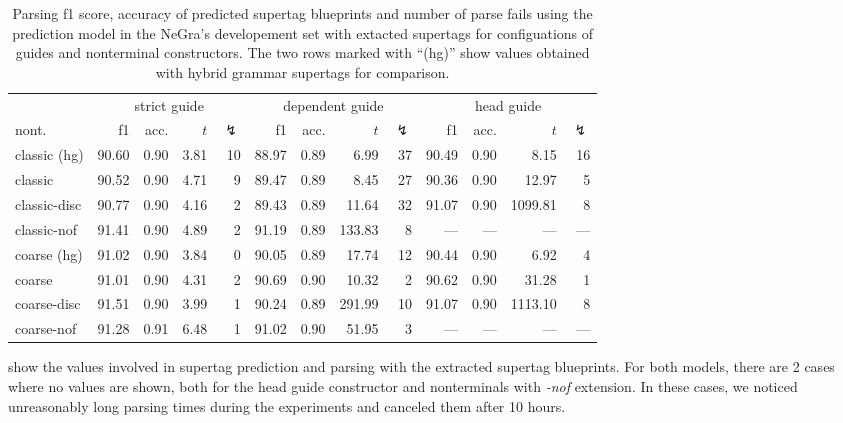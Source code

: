 \documentclass[../../document.tex]{subfiles}
\begin{document}
    \begin{table}
        \caption{\label{tbl:gridsearch:dcp:3}
        Parsing f1 score, accuracy of predicted supertag blueprints and number of parse fails using the  prediction model in the NeGra's developement set with extacted  supertags for configuations of guides and nonterminal constructors. The two rows marked with ``(hg)'' show values obtained with hybrid grammar supertags for comparison.
        }
        \centering
        \setlength{\tabcolsep}{5pt}
        \vspace{.2cm}
        \begin{tabular}{l|rrrr|rrrr|rrrr}
            \toprule
            & \multicolumn{4}{c|}{strict guide} &  \multicolumn{4}{c|}{dependent guide} &  \multicolumn{4}{c}{head guide} \\
nont.           & f1 & acc. & $t$ & $\lightning$ & f1 & acc. & $t$ & $\lightning$ & f1 & acc. & $t$ & $\lightning$  \\ \hline
\rowcolor{black!10}
classic  (hg)   & 90.60 & 0.90 & 3.81 & 10 & 88.97 & 0.89 & 6.99 & 37 & 90.49 & 0.90 & 8.15 & 16\\\hline
classic         & 90.52 & 0.90 & 4.71 &  9 & 89.47 & 0.89 & 8.45 & 27 & 90.36 & 0.90 & 12.97 & 5 \\
classic-disc    & 90.77 & 0.90 & 4.16 &  2 & 89.43 & 0.89 & 11.64 & 32 & 91.07 & 0.90 & 1099.81 & 8 \\
classic-nof     & 91.41 & 0.90 & 4.89 &  2 & 91.19 & 0.89 & 133.83 & 8 & --- & --- & --- & --- \\ \hline
\rowcolor{black!10}
coarse (hg)     & 91.02 & 0.90 & 3.84 &  0 & 90.05 & 0.89 & 17.74 & 12 & 90.44 & 0.90 & 6.92 & 4 \\ \hline
coarse          & 91.01 & 0.90 & 4.31 &  2 & 90.69 & 0.90 & 10.32 & 2 & 90.62 & 0.90 & 31.28 & 1 \\
coarse-disc     & 91.51 & 0.90 & 3.99 &  1 & 90.24 & 0.89 & 291.99 & 10 & 91.07 & 0.90 & 1113.10 & 8 \\
coarse-nof      & 91.28 & 0.91 & 6.48 &  1 & 91.02 & 0.90 & 51.95 & 3 & --- & --- & --- & --- \\
\bottomrule
        \end{tabular}
    \end{table}

     show the values involved in supertag prediction and parsing with the extracted supertag blueprints.
    For both models, there are 2 cases where no values are shown, both for the head guide constructor and nonterminals with \emph{-nof} extension.
    In these cases, we noticed unreasonably long parsing times during the experiments and canceled them after 10 hours.
    
\end{document}
